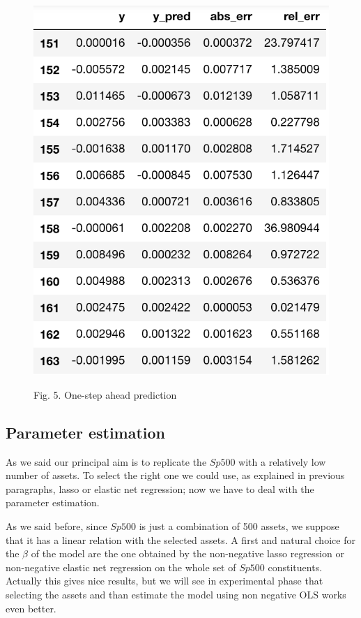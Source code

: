 \documentclass{article}%
\begin{document}
\begin{figure}[h!!!]
  \centering
  \includegraphics[scale=0.5]{pred_step1.png}     
\begin{center}
\begin{small}
Fig. 5. One-step ahead prediction
\end{small}
\end{center}
  \label{err_step}
\end{figure}


\newpage

\subsection{Parameter estimation}
As we said our principal aim is to replicate the $Sp500$ with a relatively low number of assets. To select the right one we could use, as explained in previous paragraphs, lasso or elastic net regression; now we have to deal with the parameter estimation.

As we said before, since  $Sp500$ is just a combination of 500 assets, we suppose that it has a linear relation with the selected assets. A first and natural choice for the $\beta$ of the model are the one obtained by the non-negative lasso regression or non-negative elastic net regression on the whole set of $Sp500$ constituents. Actually this gives nice results, but we will see in experimental phase that selecting the assets and than estimate the model using non negative OLS works even better. 
\\
\end{document}
